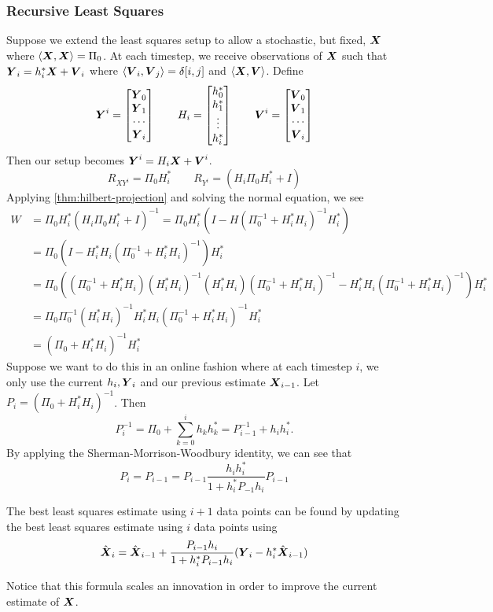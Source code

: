\subsubsection{Recursive Least Squares}
Suppose we extend the least squares setup to allow a stochastic, but fixed, $\boldsymbol{X}$ where $\langle \boldsymbol{X}, \boldsymbol{X} \rangle = \Pi_0$.
At each timestep, we receive observations of $\boldsymbol{X}$ such that $\boldsymbol{Y}_i = h_i^* \boldsymbol{X} + \boldsymbol{V}_i$ where $\langle \boldsymbol{V}_i, \boldsymbol{V}_j \rangle = \delta[i, j]$ and $\langle \boldsymbol{X}, \boldsymbol{V} \rangle$.
Define \[
	\boldsymbol{Y}^i = \begin{bmatrix} \boldsymbol{Y}_0 \\ \boldsymbol{Y}_1 \\ \cdots \\ \boldsymbol{Y}_i \end{bmatrix}
	\qquad 
	H_i = \begin{bmatrix} 
		h_0^*\\
		h_1^*\\
		\vdots\\
		h_i^*\\
	\end{bmatrix}
	\qquad
	\boldsymbol{V}^i = \begin{bmatrix} \boldsymbol{V}_0 \\ \boldsymbol{V}_1 \\ \cdots \\ \boldsymbol{V}_i \end{bmatrix}
\]
Then our setup becomes $\boldsymbol{Y}^i= H_i \boldsymbol{X} + \boldsymbol{V}^i$.
\[
	R_{XY^i} = \Pi_0 H_i^* \qquad R_{Y^i} = (H_i\Pi_0H_i^* + I)
\]
Applying \cref{thm:hilbert-projection} and solving the normal equation, we see
\begin{align*}
	W &= \Pi_0 H_i^*(H_i\Pi_0H_i^* + I)^{-1} = \Pi_0 H_i^* (I - H(\Pi_0^{-1} + H_i^*H_i)^{-1}H_i^*)\\
	&= \Pi_0 (I - H_i^*H_i(\Pi_0^{-1} + H_i^*H_i)^{-1})H_i^* \\
	&= \Pi_0 ((\Pi_0^{-1} + H_i^*H_i)(H_i^*H_i)^{-1}(H_i^*H_i)(\Pi_0^{-1} + H_i^*H_i)^{-1}- H_i^*H_i(\Pi_0^{-1} + H_i^*H_i)^{-1})H_i^*\\
	&= \Pi_0 \Pi_0^{-1}(H_i^*H_i)^{-1}H_i^*H_i(\Pi_0^{-1}+H_i^*H_i)^{-1}H_i^*\\
	&= (\Pi_0 + H_i^* H_i)^{-1}H_i^*
\end{align*}
Suppose we want to do this in an online fashion where at each timestep $i$, we only use the current $h_i, \boldsymbol{Y}_i$ and our previous estimate $\boldsymbol{X}_{i-1}$.
Let $P_i = (\Pi_0 + H_i^*H_i)^{-1}$.
Then \[
	P_i^{-1} = \Pi_0 + \sum_{k=0}^i h_k h_k^* = P_{i-1}^{-1} + h_ih_i^*.
\]
By applying the Sherman-Morrison-Woodbury identity, we can see that
\[
	P_i = P_{i-1} = P_{i-1} \frac{h_ih_i^*}{1 + h_i^*P_{-1}h_i} P_{i-1}
\]
\begin{theorem}
	The best least squares estimate using $i+1$ data points can be found by updating the best least squares estimate using $i$ data points using
	\[
		\hat{\boldsymbol{X}}_i = \hat{\boldsymbol{X}}_{i-1} + \frac{P_{i-1}h_i}{1 + h_i^*P_{i-1}h_i}(\boldsymbol{Y}_i - h_i^* \hat{\boldsymbol{X}}_{i-1})
	\]
	\label{thm:rls:update}
\end{theorem}
Notice that this formula scales an innovation in order to improve the current estimate of $\boldsymbol{X}$.

